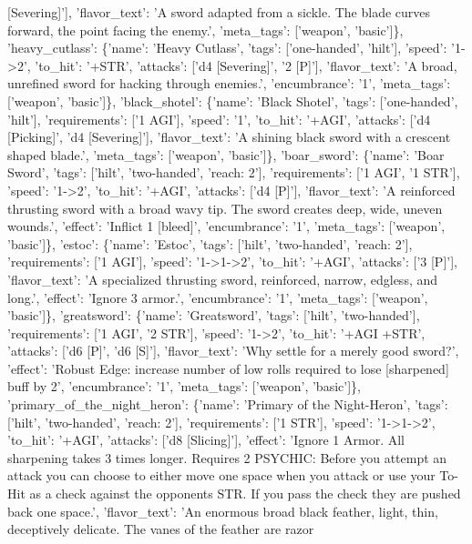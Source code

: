 \documentclass[
  letterpaper,
  DIV=11,
  numbers=noendperiod]{scrartcl}
\begin{document}
{{[}Severing{]}'{]}, 'flavor\_text': 'A sword adapted from a sickle. The
blade curves forward, the point facing the enemy.', 'meta\_tags':
{[}'weapon', 'basic'{]}\}, 'heavy\_cutlass': \{'name': 'Heavy Cutlass',
'tags': {[}'one-handed', 'hilt'{]}, 'speed': '1-\textgreater2',
'to\_hit': '+STR', 'attacks': {[}'d4 {[}Severing{]}', '2 {[}P{]}'{]},
'flavor\_text': 'A broad, unrefined sword for hacking through enemies.',
'encumbrance': '1', 'meta\_tags': {[}'weapon', 'basic'{]}\},
'black\_shotel': \{'name': 'Black Shotel', 'tags': {[}'one-handed',
'hilt'{]}, 'requirements': {[}'1 AGI'{]}, 'speed': '1', 'to\_hit':
'+AGI', 'attacks': {[}'d4 {[}Picking{]}', 'd4 {[}Severing{]}'{]},
'flavor\_text': 'A shining black sword with a crescent shaped blade.',
'meta\_tags': {[}'weapon', 'basic'{]}\}, 'boar\_sword': \{'name': 'Boar
Sword', 'tags': {[}'hilt', 'two-handed', 'reach: 2'{]}, 'requirements':
{[}'1 AGI', '1 STR'{]}, 'speed': '1-\textgreater2', 'to\_hit': '+AGI',
'attacks': {[}'d4 {[}P{]}'{]}, 'flavor\_text': 'A reinforced thrusting
sword with a broad wavy tip. The sword creates deep, wide, uneven
wounds.', 'effect': 'Inflict 1 {[}bleed{]}', 'encumbrance': '1',
'meta\_tags': {[}'weapon', 'basic'{]}\}, 'estoc': \{'name': 'Estoc',
'tags': {[}'hilt', 'two-handed', 'reach: 2'{]}, 'requirements': {[}'1
AGI'{]}, 'speed': '1-\textgreater1-\textgreater2', 'to\_hit': '+AGI',
'attacks': {[}'3 {[}P{]}'{]}, 'flavor\_text': 'A specialized thrusting
sword, reinforced, narrow, edgless, and long.', 'effect': 'Ignore 3
armor.', 'encumbrance': '1', 'meta\_tags': {[}'weapon', 'basic'{]}\},
'greatsword': \{'name': 'Greatsword', 'tags': {[}'hilt',
'two-handed'{]}, 'requirements': {[}'1 AGI', '2 STR'{]}, 'speed':
'1-\textgreater2', 'to\_hit': '+AGI +STR', 'attacks': {[}'d6 {[}P{]}',
'd6 {[}S{]}'{]}, 'flavor\_text': 'Why settle for a merely good sword?',
'effect': 'Robust Edge: increase number of low rolls required to lose
{[}sharpened{]} buff by 2', 'encumbrance': '1', 'meta\_tags':
{[}'weapon', 'basic'{]}\}, 'primary\_of\_the\_night\_heron': \{'name':
'Primary of the Night-Heron', 'tags': {[}'hilt', 'two-handed', 'reach:
2'{]}, 'requirements': {[}'1 STR'{]}, 'speed':
'1-\textgreater1-\textgreater2', 'to\_hit': '+AGI', 'attacks': {[}'d8
{[}Slicing{]}'{]}, 'effect': 'Ignore 1 Armor. All sharpening takes 3
times longer. Requires 2 PSYCHIC: Before you attempt an attack you can
choose to either move one space when you attack or use your To-Hit as a
check against the opponents STR. If you pass the check they are pushed
back one space.', 'flavor\_text': 'An enormous broad black feather,
light, thin, deceptively delicate. The vanes of the feather are razor
}
\end{document}
